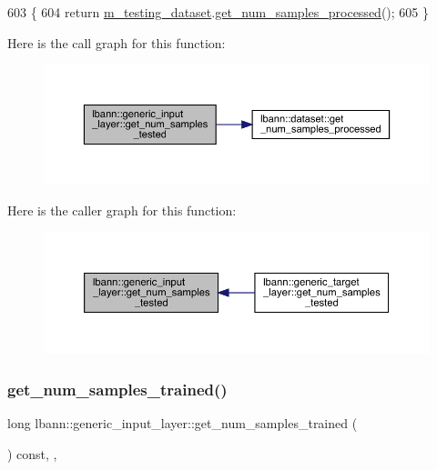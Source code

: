 \begin{DoxyCode}
603                                                \{
604     \textcolor{keywordflow}{return} \hyperlink{classlbann_1_1generic__input__layer_a66b9ec6b393695232bd98edc62fc1348}{m\_testing\_dataset}.\hyperlink{classlbann_1_1dataset_a73496347a477a5ebb0dbf30140295026}{get\_num\_samples\_processed}();
605   \}
\end{DoxyCode}
Here is the call graph for this function\+:\nopagebreak
\begin{figure}[H]
\begin{center}
\leavevmode
\includegraphics[width=350pt]{classlbann_1_1generic__input__layer_a68b162bcc5fdfe2bb7279eb5d83cf884_cgraph}
\end{center}
\end{figure}
Here is the caller graph for this function\+:\nopagebreak
\begin{figure}[H]
\begin{center}
\leavevmode
\includegraphics[width=350pt]{classlbann_1_1generic__input__layer_a68b162bcc5fdfe2bb7279eb5d83cf884_icgraph}
\end{center}
\end{figure}
\mbox{\label{classlbann_1_1generic__input__layer_a95a7a5ad2a6089ffb9197632015e6062}} 
\subsubsection{\texorpdfstring{get\+\_\+num\+\_\+samples\+\_\+trained()}{get\_num\_samples\_trained()}}
{\footnotesize\ttfamily long lbann\+::generic\+\_\+input\+\_\+layer\+::get\+\_\+num\+\_\+samples\+\_\+trained (\begin{DoxyParamCaption}{ }\end{DoxyParamCaption}) const\hspace{0.3cm}{\ttfamily [inline]}, {\ttfamily [override]}, {\ttfamily [virtual]}}



